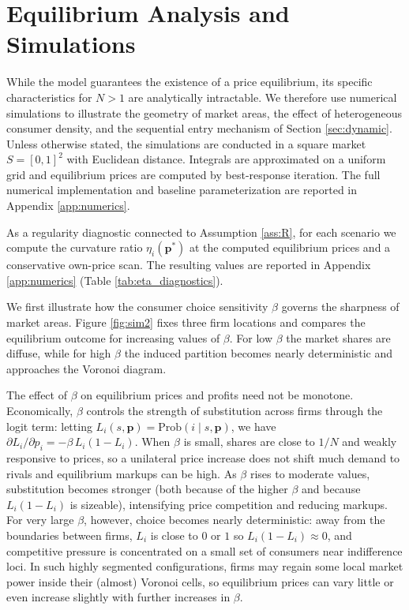 \documentclass{article}
\begin{document}
\section{Equilibrium Analysis and Simulations}
\label{sec:simulations}

While the model guarantees the existence of a price equilibrium, its specific characteristics for $N > 1$ are analytically intractable. We therefore use numerical simulations to illustrate the geometry of market areas, the effect of heterogeneous consumer density, and the sequential entry mechanism of Section \ref{sec:dynamic}. Unless otherwise stated, the simulations are conducted in a square market $S = [0,1]^2$ with Euclidean distance. Integrals are approximated on a uniform grid and equilibrium prices are computed by best-response iteration. The full numerical implementation and baseline parameterization are reported in Appendix \ref{app:numerics}.

As a regularity diagnostic connected to Assumption \ref{ass:R}, for each scenario we compute the curvature ratio $\eta_i(\mathbf{p}^*)$ at the computed equilibrium prices and a conservative own-price scan. The resulting values are reported in Appendix \ref{app:numerics} (Table \ref{tab:eta_diagnostics}).

We first illustrate how the consumer choice sensitivity $\beta$ governs the sharpness of market areas. Figure \ref{fig:sim2} fixes three firm locations and compares the equilibrium outcome for increasing values of $\beta$. For low $\beta$ the market shares are diffuse, while for high $\beta$ the induced partition becomes nearly deterministic and approaches the Voronoi diagram.

The effect of $\beta$ on equilibrium prices and profits need not be monotone. Economically, $\beta$ controls the strength of substitution across firms through the logit term: letting $L_i(s,\mathbf{p})=\mathrm{Prob}(i\mid s,\mathbf{p})$, we have $\partial L_i/\partial p_i = -\beta\,L_i(1-L_i)$. When $\beta$ is small, shares are close to $1/N$ and weakly responsive to prices, so a unilateral price increase does not shift much demand to rivals and equilibrium markups can be high. As $\beta$ rises to moderate values, substitution becomes stronger (both because of the higher $\beta$ and because $L_i(1-L_i)$ is sizeable), intensifying price competition and reducing markups. For very large $\beta$, however, choice becomes nearly deterministic: away from the boundaries between firms, $L_i$ is close to $0$ or $1$ so $L_i(1-L_i)\approx 0$, and competitive pressure is concentrated on a small set of consumers near indifference loci. In such highly segmented configurations, firms may regain some local market power inside their (almost) Voronoi cells, so equilibrium prices can vary little or even increase slightly with further increases in $\beta$.
\end{document}
